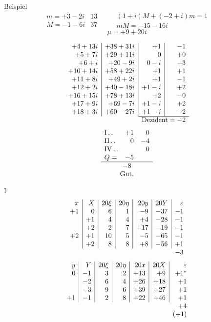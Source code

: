 Beispiel
\[
\begin{array}{r|r}
m=+3-2i&13\\
M=-1-6i&37
\end{array}
\qquad
\begin{gathered}
(1+i)M+(-2+i)m=1\\
mM=-15-16i
\end{gathered}
\]
\[
\mu=+9+20i
\]

\[
\begin{array}{r|r|r|r}
+4+13i&+38+31i&+1&-1\\
+5+7i&+29+11i&0&+0\\
+6+i&+20-9i&0-i&-3\\
+10+14i&+58+22i&+1&+1\\
+11+8i&+49+2i&+1&-1\\
+12+2i&+40-18i&+1-i&+2\\
+16+15i&+78+13i&+2&-0\\
+17+9i&+69-7i&+1-i&+2\\
+18+3i&+60-27i&+1-i&-2\\ \cline{3-4}
\multicolumn{2}{c}{}&\multicolumn{2}{c}{\text{Dezident}=-2}
\end{array}
\]
\[
\begin{array}{lrr}
\mathrm{I}\dotstwo&+1&0\\
\mathrm{II}\dotstwo&0&-4\\
\mathrm{IV}\dotstwo&&0\\
Q=&-5&\\ \hline
\multicolumn{3}{c}{-8}\\
\multicolumn{3}{c}{\text{Gut.}}
\end{array}
\]

\noindent I
\[
\begin{array}{r|r|r|r|r|r|r}
x&X&20\xi&20\eta&20y&20Y&\varepsilon\\
+1&0&6&1&-9&-37&-1\\
&+1&4&4&+4&-28&-1\\
&+2&2&7&+17&-19&-1\\
+2&+1&10&5&-5&-65&-1\\
&+2&8&8&+8&-56&+1\\
\multicolumn{6}{c}{}&-3
\end{array}
\]
\[
\begin{array}{r|r|r|r|r|r|r}
y&Y&20\xi&20\eta&20x&20X&\varepsilon\\
0&-1&3&2&+13&+9&+1^{*}\\
&-2&6&4&+26&+18&+1\\
&-3&9&6&+39&+27&+1\\
+1&-1&2&8&+22&+46&+1\\
\multicolumn{6}{c}{}&+4\\
\multicolumn{6}{c}{}&(+1)
\end{array}
\]

